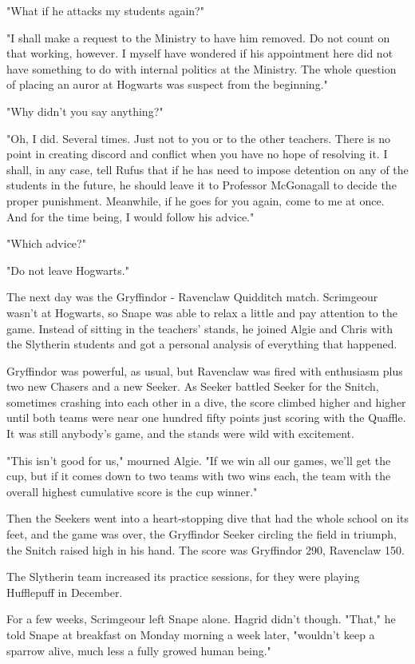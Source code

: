 "What if he attacks my students again?"

"I shall make a request to the Ministry to have him removed. Do not count on that working, however. I myself have wondered if his appointment here did not have something to do with internal politics at the Ministry. The whole question of placing an auror at Hogwarts was suspect from the beginning."

"Why didn't you say anything?"

"Oh, I did. Several times. Just not to you or to the other teachers. There is no point in creating discord and conflict when you have no hope of resolving it. I shall, in any case, tell Rufus that if he has need to impose detention on any of the students in the future, he should leave it to Professor McGonagall to decide the proper punishment. Meanwhile, if he goes for you again, come to me at once. And for the time being, I would follow his advice."

"Which advice?"

"Do not leave Hogwarts."

The next day was the Gryffindor - Ravenclaw Quidditch match. Scrimgeour wasn't at Hogwarts, so Snape was able to relax a little and pay attention to the game. Instead of sitting in the teachers' stands, he joined Algie and Chris with the Slytherin students and got a personal analysis of everything that happened.

Gryffindor was powerful, as usual, but Ravenclaw was fired with enthusiasm plus two new Chasers and a new Seeker. As Seeker battled Seeker for the Snitch, sometimes crashing into each other in a dive, the score climbed higher and higher until both teams were near one hundred fifty points just scoring with the Quaffle. It was still anybody's game, and the stands were wild with excitement.

"This isn't good for us," mourned Algie. "If we win all our games, we'll get the cup, but if it comes down to two teams with two wins each, the team with the overall highest cumulative score is the cup winner."

Then the Seekers went into a heart-stopping dive that had the whole school on its feet, and the game was over, the Gryffindor Seeker circling the field in triumph, the Snitch raised high in his hand. The score was Gryffindor 290, Ravenclaw 150.

The Slytherin team increased its practice sessions, for they were playing Hufflepuff in December.

For a few weeks, Scrimgeour left Snape alone. Hagrid didn't though. "That," he told Snape at breakfast on Monday morning a week later, "wouldn't keep a sparrow alive, much less a fully growed human being."

